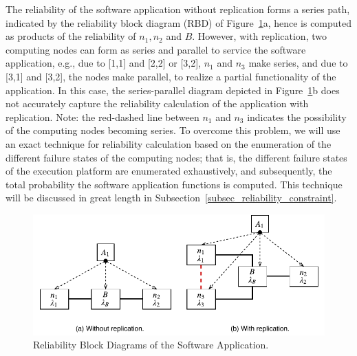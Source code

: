 The reliability of the software application without replication forms a series path, indicated by the reliability block diagram (RBD) of Figure~\ref{fig_rbd}a, hence is computed as products of the reliability of $n_1,n_2$ and $B$. However, with replication, two computing nodes can form as series and parallel to service the software application,  e.g., due to [1,1] and [2,2] or [3,2], $n_1$ and $n_3$ make series, and due to [3,1] and [3,2], the nodes make parallel, to realize a partial functionality of the application. In this case, the series-parallel diagram depicted in Figure~\ref{fig_rbd}b does not accurately capture the reliability calculation of the application with replication. Note: the red-dashed line between $n_1$ and $n_3$ indicates the possibility of the computing nodes becoming series. To overcome this problem, we will use an exact technique for reliability calculation based on the enumeration of the different failure states of the computing nodes; that is, the different failure states of the execution platform are enumerated exhaustively, and subsequently, the total probability the software application functions is computed. This technique will be discussed in great length in Subsection~\ref{subsec_reliability_constraint}.
\begin{figure}
	\centering
	\includegraphics[width=0.8\linewidth]{img/rbd_replication}
	\caption{Reliability Block Diagrams of the Software Application.}
	\label{fig_rbd}
\end{figure}



